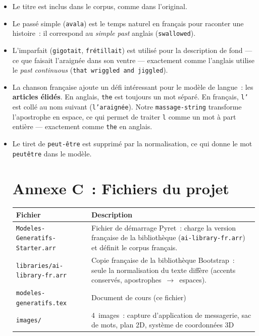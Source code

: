 \documentclass[12pt,a4paper]{article}
\begin{document}
\begin{itemize}
  \item Le titre est inclus dans le corpus, comme dans l'original.
  \item Le passé simple (\texttt{avala}) est le temps naturel en français pour raconter une histoire~: il correspond au \emph{simple past} anglais (\texttt{swallowed}).
  \item L'imparfait (\texttt{gigotait}, \texttt{frétillait}) est utilisé pour la description de fond — ce que faisait l'araignée dans son ventre — exactement comme l'anglais utilise le \emph{past continuous} (\texttt{that wriggled and jiggled}).
  \item La chanson française ajoute un défi intéressant pour le modèle de langue~: les \textbf{articles élidés}. En anglais, \texttt{the} est toujours un mot séparé. En français, \texttt{l'} est collé au nom suivant (\texttt{l'araignée}). Notre \texttt{massage-string} transforme l'apostrophe en espace, ce qui permet de traiter \texttt{l} comme un mot à part entière — exactement comme \texttt{the} en anglais.
  \item Le tiret de \texttt{peut-être} est supprimé par la normalisation, ce qui donne le mot \texttt{peutêtre} dans le modèle.

\section*{Annexe C~: Fichiers du projet}

\begin{center}
\begin{tabularx}{\textwidth}{l X}
  \toprule
  \textbf{Fichier} & \textbf{Description} \\
  \midrule
  \texttt{Modeles\allowbreak-Generatifs\allowbreak-Starter.arr} & Fichier de démarrage Pyret~: charge la version française de la bibliothèque (\texttt{ai-library-fr.arr}) et définit le corpus français. \\
  \texttt{libraries/ai-library-fr.arr} & Copie française de la bibliothèque Bootstrap~: seule la normalisation du texte diffère (accents conservés, apostrophes~$\to$~espaces). \\
  \texttt{modeles-generatifs.tex} & Document de cours (ce fichier) \\
  \texttt{images/} & 4~images~: capture d'application de messagerie, sac de mots, plan 2D, système de coordonnées 3D \\
  \bottomrule
\end{tabularx}
\end{center}


\end{itemize}
\end{document}
